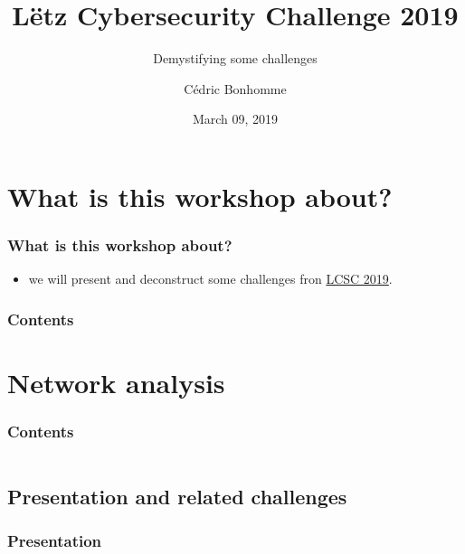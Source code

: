 \documentclass[]{beamer}
\title[Demystifying some challenges from LCSC 2019]{Lëtz Cybersecurity Challenge 2019}
\subtitle{Demystifying some challenges}
\author{C\'{e}dric Bonhomme}
\institute[SMILE]{Security Made In Lëtzebuerg}
\date{March 09, 2019}
\begin{document}
\begin{frame}
    \titlepage
\end{frame}


%
%
\section*{What is this workshop about?}
\begin{frame}
    \frametitle{What is this workshop about?}
    \begin{center}
        \begin{itemize}
            \item we will present and deconstruct some challenges fron \href{https://github.com/cscluxembourg/vestatech}{LCSC 2019}.
        \end{itemize}
    \end{center}
\end{frame}


\begin{frame}
    \frametitle{Contents}
    \tableofcontents
\end{frame}



%
%
\section{Network analysis}
\begin{frame}
    \frametitle{Contents}
    \begin{columns}[t]
        \begin{column}{5cm}
            \tableofcontents[sections={1-2}, currentsection, hideothersubsections]
        \end{column}
        \begin{column}{5cm}
            \tableofcontents[sections={3-4}, currentsection, hideothersubsections]
        \end{column}
    \end{columns}
\end{frame}
\subsection{Presentation and related challenges}
\begin{frame}
\frametitle{Presentation}
\framesubtitle{}

\end{frame}
\end{document}
